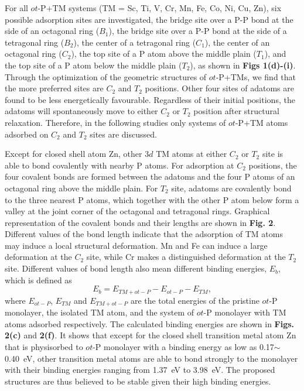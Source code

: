 \documentclass[%
superscriptaddress,
preprint,
showpacs,preprintnumbers,
 amsmath,amssymb,
prb,
]{revtex4-1}
\begin{document}
 For all $ot$-P+TM
systems (TM = Sc, Ti, V, Cr, Mn, Fe, Co, Ni, Cu, Zn), six possible
adsorption sites are investigated, the bridge site over a P-P bond
at the side of an octagonal ring ($B_{1}$), the bridge site over
a P-P bond at the side of a tetragonal ring ($B_{2}$), the center
of a tetragonal ring ($C_{1}$), the center of an octagonal ring ($C_{2}$),
the top site of a P atom above the middle plain ($T_{1}$), and the
top site of a P atom below the middle plain ($T_{2}$), as shown in
\textbf{Figs 1(d)-(i)}. Through the optimization of the geometric structures of $ot$-P+TMs, we find that the more preferred sites are $C_{2}$ and $T_{2}$ positions. Other four sites of adatoms are found to be less energetically favourable. Regardless of their initial positions, the adatoms will spontaneously move to either $C_{2}$ or $T_{2}$ position after structural relaxation.
Therefore, in the following studies only systems of $ot$-P+TM atoms adsorbed on $C_{2}$ and $T_{2}$ sites are discussed.

Except for closed shell atom Zn, other 3$d$ TM atoms at either $C_{2}$ or $T_{2}$
site is able to bond covalently with nearby P atoms. For adsorption
at $C_{2}$ positions, the four covalent bonds are formed between
the adatoms and the four P atoms of an octagonal ring above the middle
plain. For $T_{2}$ site, adatoms are covalently bond to the three
nearest P atoms, which together with the other P atom below form a
valley at the joint corner of the octagonal and tetragonal rings.
Graphical representation of the covalent bonds and their lengths are
shown in \textbf{Fig. 2}. Different values of the bond length indicate that the adsorption of TM atoms may induce a local structural deformation. Mn and Fe can induce a large deformation at the $C_2$ site, while Cr makes a distinguished deformation at the $T_2$ site. Different values of bond length also mean different binding energies, $E_{b}$, which is defined as
\begin{equation}
E_{b}=E_{TM+ot-P}-E_{ot-P}-E_{TM},\label{Eb}
\end{equation}
where $E_{ot-P}$, $E_{TM}$ and $E_{TM+ot-P}$ are the total energies
of the pristine $ot$-P monolayer, the isolated TM atom, and the system
of $ot$-P monolayer with TM atoms adsorbed respectively. The calculated binding energies are shown in \textbf{Figs. 2(c)} and \textbf{2(f)}. It shows that except for the
closed shell transition metal atom Zn that is physisorbed to $ot$-P monolayer
with a binding energy as low as 0.17$\sim$0.40~eV, other transition
metal atoms are able to bond strongly to the monolayer with their
binding energies ranging from 1.37~eV to 3.98~eV. The proposed
structures are thus believed to be stable given their high binding
energies.
\end{document}
